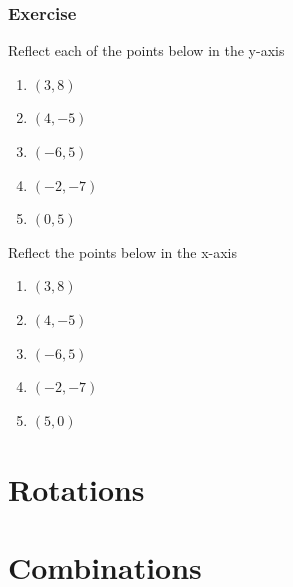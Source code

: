 \subsubsection{Exercise}
Reflect each of the points below in the y-axis
	\begin{enumerate}
		\item $(3, 8)$
		\item $(4, -5)$
		\item $(-6, 5)$
		\item $(-2, -7)$
		\item $(0, 5)$
	\end{enumerate}
	Reflect the points below in the x-axis
	\begin{enumerate}
		\item $(3, 8)$
		\item $(4, -5)$
		\item $(-6, 5)$
		\item $(-2, -7)$
		\item $(5, 0)$
	\end{enumerate}

\section{Rotations}
\section{Combinations}
